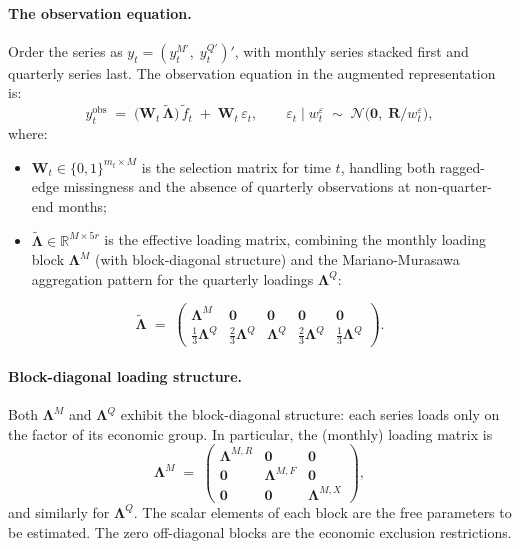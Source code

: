 \documentclass[11pt, a4paper, oneside]{article}
\newcommand{\mL}{\boldsymbol{\Lambda}}
\begin{document}
\paragraph{The observation equation.}
Order the series as $y_t = (y^{M\prime}_t,\; y^{Q\prime}_t)'$, with
monthly series stacked first and quarterly series last. The
observation equation in the augmented representation is:
\begin{equation}
y_t^{\mathrm{obs}} \;=\; \big(\mathbf{W}_t\, \tilde{\mL}\big)\, \tilde{f}_t \;+\; \mathbf{W}_t\, \varepsilon_t,
\qquad
\varepsilon_t \mid w^\varepsilon_t \;\sim\; \mathcal{N}\!\big(\mathbf{0},\; \mathbf{R}/w^\varepsilon_t\big),
\label{eq:final-obs}
\end{equation}
where:
\begin{itemize}[leftmargin=1.5em, itemsep=2pt]
    \item $\mathbf{W}_t \in \{0,1\}^{m_t \times M}$ is the selection
          matrix for time $t$, handling both ragged-edge missingness
          and the absence of quarterly observations at non-quarter-end
          months;
    \item $\tilde{\mL} \in \mathbb{R}^{M \times 5r}$ is the
          effective loading matrix, combining the monthly loading block
          $\mL^M$ (with block-diagonal structure) and the
          Mariano-Murasawa aggregation pattern for the quarterly
          loadings $\mL^Q$:
\end{itemize}
\begin{equation}
\tilde{\mL} \;=\; \begin{pmatrix}
\mL^M & \mathbf{0} & \mathbf{0} & \mathbf{0} & \mathbf{0} \\
\tfrac{1}{3}\mL^Q & \tfrac{2}{3}\mL^Q & \mL^Q & \tfrac{2}{3}\mL^Q & \tfrac{1}{3}\mL^Q
\end{pmatrix}.
\label{eq:final-Lambda-tilde}
\end{equation}

\paragraph{Block-diagonal loading structure.}
Both $\mL^M$ and $\mL^Q$ exhibit the
block-diagonal structure: each
series loads only on the factor of its economic group. In particular,
the (monthly) loading matrix is
\[
\mL^M \;=\; \begin{pmatrix}
\mL^{M,R} & \mathbf{0} & \mathbf{0} \\
\mathbf{0} & \mL^{M,F} & \mathbf{0} \\
\mathbf{0} & \mathbf{0} & \mL^{M,X}
\end{pmatrix},
\]
and similarly for $\mL^Q$. The scalar elements of each
block are the free parameters to be estimated. The zero off-diagonal
blocks are the economic exclusion restrictions.
\end{document}
